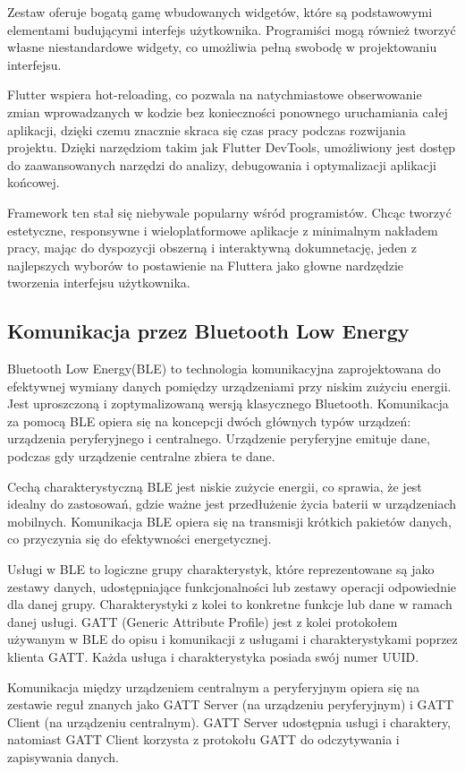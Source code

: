 \documentclass[12pt,twoside]{article}
\begin{document}
Zestaw oferuje bogatą gamę wbudowanych widgetów, które są podstawowymi elementami budującymi interfejs użytkownika. Programiści mogą również tworzyć własne niestandardowe widgety, co umożliwia pełną swobodę w projektowaniu interfejsu.

Flutter wspiera hot-reloading, co pozwala na natychmiastowe obserwowanie zmian wprowadzanych w kodzie bez konieczności ponownego uruchamiania całej aplikacji, dzięki czemu znacznie skraca się czas pracy podczas rozwijania projektu.
Dzięki narzędziom takim jak Flutter DevTools, umożliwiony jest dostęp do zaawansowanych narzędzi do analizy, debugowania i optymalizacji aplikacji końcowej.\cite{flutterDocs}

Framework ten stał się niebywale popularny wśród programistów. Chcąc tworzyć estetyczne, responsywne i wieloplatformowe aplikacje z minimalnym nakładem pracy, mając do dyspozycji obszerną i interaktywną dokumnetację, jeden z najlepszych wyborów to postawienie na Fluttera jako głowne nardzędzie tworzenia interfejsu użytkownika.
\subsection{Komunikacja przez Bluetooth Low Energy}
Bluetooth Low Energy(BLE)\cite{ble} to technologia komunikacyjna zaprojektowana do efektywnej wymiany danych pomiędzy urządzeniami przy niskim zużyciu energii. Jest uproszczoną i zoptymalizowaną wersją klasycznego Bluetooth.
Komunikacja za pomocą BLE opiera się na koncepcji dwóch głównych typów urządzeń: urządzenia peryferyjnego i centralnego. Urządzenie peryferyjne emituje dane, podczas gdy urządzenie centralne zbiera te dane.

Cechą charakterystyczną BLE jest niskie zużycie energii, co sprawia, że jest idealny do zastosowań, gdzie ważne jest przedłużenie życia baterii w urządzeniach mobilnych.
Komunikacja BLE opiera się na transmisji krótkich pakietów danych, co przyczynia się do efektywności energetycznej.

Usługi w BLE to logiczne grupy charakterystyk, które reprezentowane są jako zestawy danych, udostępniające funkcjonalności lub zestawy operacji odpowiednie dla danej grupy. Charakterystyki z kolei to konkretne funkcje lub dane w ramach danej usługi. GATT (Generic Attribute Profile) jest z kolei protokołem używanym w BLE do opisu i komunikacji z usługami i charakterystykami poprzez klienta GATT. Każda usługa i charakterystyka posiada swój numer UUID.

Komunikacja między urządzeniem centralnym a peryferyjnym opiera się na zestawie reguł znanych jako GATT Server (na urządzeniu peryferyjnym) i GATT Client (na urządzeniu centralnym). GATT Server udostępnia usługi i charaktery, natomiast GATT Client korzysta z protokołu GATT do odczytywania i zapisywania danych.
\end{document}
